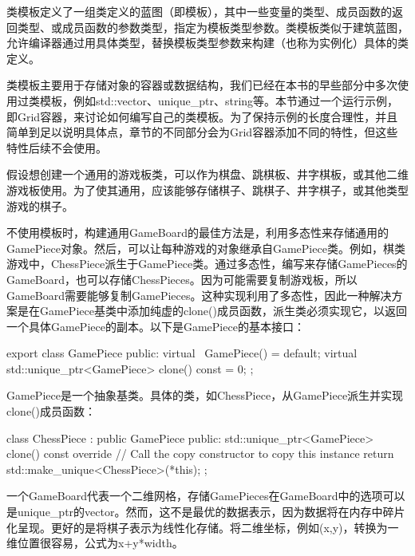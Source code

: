 
类模板定义了一组类定义的蓝图（即模板），其中一些变量的类型、成员函数的返回类型、或成员函数的参数类型，指定为模板类型参数。类模板类似于建筑蓝图，允许编译器通过用具体类型，替换模板类型参数来构建（也称为实例化）具体的类定义。

类模板主要用于存储对象的容器或数据结构，我们已经在本书的早些部分中多次使用过类模板，例如std::vector、unique\_ptr、string等。本节通过一个运行示例，即Grid容器，来讨论如何编写自己的类模板。为了保持示例的长度合理性，并且简单到足以说明具体点，章节的不同部分会为Grid容器添加不同的特性，但这些特性后续不会使用。


假设想创建一个通用的游戏板类，可以作为棋盘、跳棋板、井字棋板，或其他二维游戏板使用。为了使其通用，应该能够存储棋子、跳棋子、井字棋子，或其他类型游戏的棋子。


不使用模板时，构建通用GameBoard的最佳方法是，利用多态性来存储通用的GamePiece对象。然后，可以让每种游戏的对象继承自GamePiece类。例如，棋类游戏中，ChessPiece派生于GamePiece类。通过多态性，编写来存储GamePieces的GameBoard，也可以存储ChessPieces。因为可能需要复制游戏板，所以GameBoard需要能够复制GamePieces。这种实现利用了多态性，因此一种解决方案是在GamePiece基类中添加纯虚的clone()成员函数，派生类必须实现它，以返回一个具体GamePiece的副本。以下是GamePiece的基本接口：

\begin{cpp}
export class GamePiece
{
    public:
        virtual ~GamePiece() = default;
        virtual std::unique_ptr<GamePiece> clone() const = 0;
};
\end{cpp}

GamePiece是一个抽象基类。具体的类，如ChessPiece，从GamePiece派生并实现clone()成员函数：

\begin{cpp}
class ChessPiece : public GamePiece
{
    public:
        std::unique_ptr<GamePiece> clone() const override
        {
            // Call the copy constructor to copy this instance
            return std::make_unique<ChessPiece>(*this);
        }
};
\end{cpp}

一个GameBoard代表一个二维网格，存储GamePieces在GameBoard中的选项可以是unique\_ptr的vector。然而，这不是最优的数据表示，因为数据将在内存中碎片化呈现。更好的是将棋子表示为线性化存储。将二维坐标，例如(x,y)，转换为一维位置很容易，公式为x+y*width。

